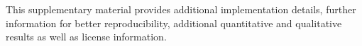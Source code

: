 This supplementary material provides additional implementation details, further information for better reproducibility, additional quantitative and qualitative results as well as license information.